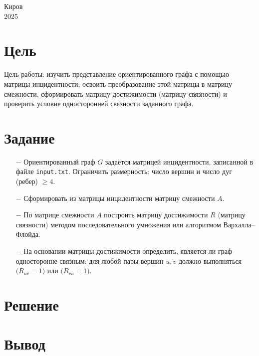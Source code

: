 \documentclass[oneside,a4paper,14pt]{extarticle}
\begin{document}
\begin{center}
	Киров\\
	2025
\end{center}

\newpage\thispagestyle{plain}

\section*{Цель}

Цель работы: изучить представление ориентированного графа с помощью матрицы инцидентности, освоить преобразование этой матрицы в матрицу смежности, сформировать матрицу достижимости (матрицу связности) и проверить условие односторонней связности заданного графа.

\section*{Задание}
\begin{itemize}
	\item[$-$] Ориентированный граф \(G\) задаётся матрицей инцидентности, записанной в файле \texttt{input.txt}. Ограничить размерность: число вершин и число дуг (ребер) \(\ge 4\).
	\item[$-$] Сформировать из матрицы инцидентности матрицу смежности \(A\).
	\item[$-$] По матрице смежности \(A\) построить матрицу достижимости \(R\) (матрицу связности) методом последовательного умножения или алгоритмом Вархалла–Флойда.
	\item[$-$] На основании матрицы достижимости определить, является ли граф односторонне связным: для любой пары вершин \(u,v\) должно выполняться \(\bigl(R_{uv}=1\bigr)\) или \(\bigl(R_{vu}=1\bigr)\).
\end{itemize}

\section*{Решение}


\clearpage

\section*{Вывод}
\end{document}
